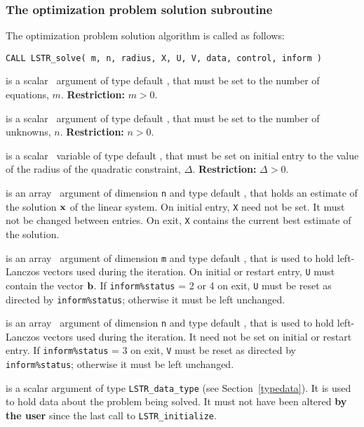 \documentclass{galahad}
\newcommand{\packagename}{LS\-TR}
\begin{document}

\subsubsection{The optimization problem solution subroutine}
The optimization problem solution algorithm is called as follows:

\hskip0.5in 
{\tt CALL \packagename\_solve( m, n, radius, X, U, V, data, control, inform )}

\begin{description}

 is a scalar \intentin\ argument of type default \integer, that must be 
set to the number of equations, $m$. {\bf Restriction: } $m > 0$. 
 
 is a scalar \intentin\ argument of type default \integer, that must be 
set to the number of unknowns, $n$. {\bf Restriction: } $n > 0$. 
 
 is a scalar \intentin\ variable of type default 
\realdp, 
that must be set on initial entry
to the value of the radius of the quadratic constraint, $\Delta$. 
{\bf Restriction: } $\Delta > 0$. 
 
 is an array \intentinout\ argument of dimension {\tt n} and  
type default \realdp,  
that holds an estimate of the solution ${\mathbf{x}}$ of the linear system. 
On initial entry, {\tt X} need not be set. 
It must not be changed between entries. 
On exit, {\tt X} contains the current best estimate of the solution. 
 
 is an array \intentinout\ argument of dimension {\tt m} and  
type default \realdp,  
that is used to hold left-Lanczos vectors used during the iteration.
On initial or restart entry, {\tt U} must contain the vector ${\mathbf{b}}$.  
If {\tt inform\%status} = 2 or 4 on exit, {\tt U} must be reset
as directed by  {\tt inform\%status}; otherwise  
it must be left unchanged. 
 
 is an array \intentinout\ argument of dimension {\tt n} and  
type default \realdp,  
that is used to hold left-Lanczos vectors used during the iteration.
It need not be set on initial or restart entry.
If {\tt inform\%status} = 3 on exit, {\tt V} must be reset
as directed by  {\tt inform\%status}; otherwise it must be left unchanged. 
 
 is a scalar \intentinout argument of type 
{\tt \packagename\_data\_type}
(see Section~\ref{typedata}). It is used to hold data about the problem being 
solved. It must not have been altered {\bf by the user} since the last call to 
{\tt \packagename\_initialize}.


\end{description}
\end{document}
